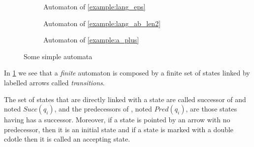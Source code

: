 \begin{figure}[h]
    \centering
    \begin{subfigure}{0.45\textwidth}
        \centering
        \caption{Automaton of \cref{example:lang_eps}}
    \end{subfigure}
    \begin{subfigure}{0.45\textwidth}
        \centering
        \caption{Automaton of \cref{example:lang_ab_len2}}
    \end{subfigure}
    \begin{subfigure}{0.45\textwidth}
        \centering
        \caption{Automaton of \cref{example:a_plus}}
    \end{subfigure}
    \caption{Some simple automata}
    \label{simple_automata}
\end{figure}

In \cref{simple_automata} we see that a \textit{finite} automaton is composed by a finite set of states linked by labelled arrows called \textit{transitions}.

The set of states that are directly linked with a state \qi{} are called successor of \qi{} and noted $Succ(q_i)$, and the predecessors of \qi{}, noted $Pred(q_i)$, are those states having \qi{} has a successor. Moreover, if a state is pointed by an arrow with no predecessor, then it is an initial state and if a state is marked with a double cdotle then it is called an accepting state.

